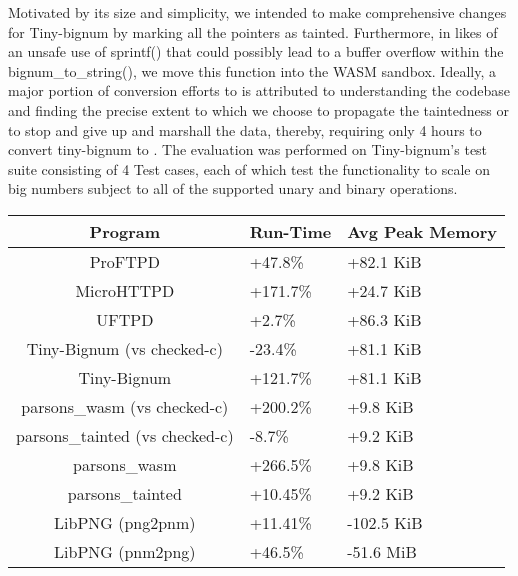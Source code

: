 Motivated by its size and simplicity, we intended to make comprehensive \systemname changes for Tiny-bignum by marking all the pointers as tainted. Furthermore, in likes of an unsafe use of sprintf() that could possibly lead to a buffer overflow within the bignum\_to\_string(), we move this function into the WASM sandbox. Ideally, a major portion of conversion efforts to \systemname is attributed to understanding the codebase and finding the precise extent to which we choose to propagate the taintedness or to stop and give up and marshall the data, thereby, requiring only 4 hours to convert tiny-bignum to \systemname. The evaluation was performed on Tiny-bignum's test suite consisting of 4 Test cases, each of which test the functionality to scale on big numbers subject to all of the supported unary and binary operations.  

\begin{center}
\label{fig:prgrbenchmarks}
\begin{tabular}{||c | p{1.3cm} | p{1.8cm}||} 
 \hline
 Program & Run-Time & Avg Peak Memory \\ [0.5ex] 
 \hline\hline
 ProFTPD & +47.8\% & +82.1 KiB  \\
 MicroHTTPD & +171.7\% & +24.7 KiB\\ 
 UFTPD & +2.7\% & +86.3 KiB \\ 
 Tiny-Bignum (vs checked-c) & -23.4\% &  +81.1 KiB \\
 Tiny-Bignum &  +121.7\% &  +81.1 KiB \\
 parsons\_wasm (vs checked-c) & +200.2\% & +9.8 KiB\\ 
 parsons\_tainted (vs checked-c) & -8.7\% & +9.2 KiB\\
 parsons\_wasm & +266.5\% & +9.8 KiB\\ 
 parsons\_tainted & +10.45\% & +9.2 KiB\\ 
 LibPNG (png2pnm) & +11.41\% & -102.5 KiB\\ 
 LibPNG (pnm2png) & +46.5\% & -51.6 MiB\\ [1ex]
 \hline 

\end{tabular}
\end{center}


